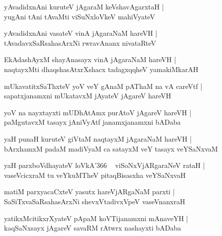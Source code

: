 \documentclass[twoside,12pt,openright]{book}
\newcounter{shloka}[chapter]
\begin{document}
\begin{shloka}%
yAvadidxnAni kuruteV jAgaraM keVshavAgarxtaH |\\
yugAni tAni tAvaMti viSuNxloVkeV mahiVyateV
\end{shloka}

\begin{shloka}%
yAvadidxnAni vasateV vinA jAgaraNaM hareVH |\\
tAvadavxSaRsahasArxNi rwravAnanx nivataRteV
\end{shloka}

\begin{shloka}%
EkAdashAyxM shayAnasayx vinA jAgaraNaM hareVH |\\
naqtayxMti dhaqshasAtxrXshacx tadagxqqheV yamakiMkarAH 
\end{shloka}

\begin{shloka}%
mUkavatitxSaThxteV yoV veY gAnaM pAThaM na vA careVtf |\\
sapatxjanamxni mUkatavxM jAyateV jAgareV hareVH 
\end{shloka}

\begin{shloka}%
yoV na nayxtayxti mUDhAtAmx purAtoV jAgareV hareVH |\\
paMgutavxM tasayx jAniVyAtf janamxjanamxni bADaba
\end{shloka}

\begin{shloka}%
yaH punaH kuruteV giVtaM naqtayxM jAgaraNaM hareVH |\\
bArxhamxM padaM madiVyaM ca satayxM veY tasayx veYSaNxvaM 
\end{shloka}

\begin{shloka}%
yaH parxboVdhayateV loVkA\char'366 ~ viSoNxVjARgaraNeV rataH |\\
vaseVcicxraM tu veYkuMTheV pitaqBisasxha veYSaNxvaH 
\end{shloka}

\begin{shloka}%
matiM parxyacaCxteV yasutx hareVjARgaNaM parxti |\\
SaSiTxvaSaRsahasArxNi shevxVtadivxVpeV vaseVnanxraH 
\end{shloka}

\begin{shloka}%
yatikxMcitikxrXyateV pApaM koVTijanamxni mAnaveYH |\\
kaqSaNxsayx jAgareV savaRM rAtwrx nashayxti bADaba
\end{shloka}
\end{document}
